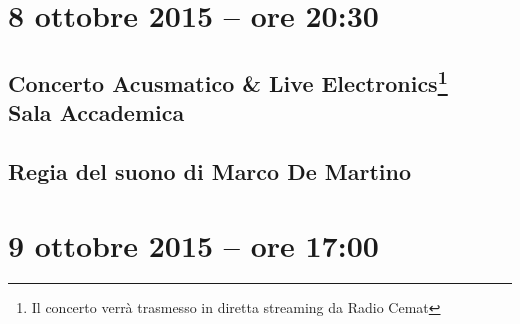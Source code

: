 \documentclass[8pt, twoside, a5paper]{extreport}
\begin{document}


\begin{multicols}{2}




\end{multicols}

\clearpage

\section*{8 ottobre 2015 -- ore 20:30}

\subsection*{{\small Concerto Acusmatico \& Live Electronics\footnote{ Il concerto verrà trasmesso in diretta streaming da Radio Cemat}} \\
	\textsf{Sala Accademica}}

{\fontsize{30}{30} }

\subsection*{\textsf{Regia del suono di Marco De Martino}}

\bigskip

\begin{multicols}{2}




\end{multicols}

\clearpage


\section*{9 ottobre 2015 -- ore 17:00}
\end{document}

